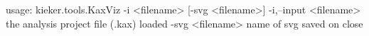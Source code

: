 usage: kieker.tools.KaxViz -i <filename> [-svg <filename>]
 -i,--input <filename>   the analysis project file (.kax) loaded
 -svg <filename>         name of svg saved on close